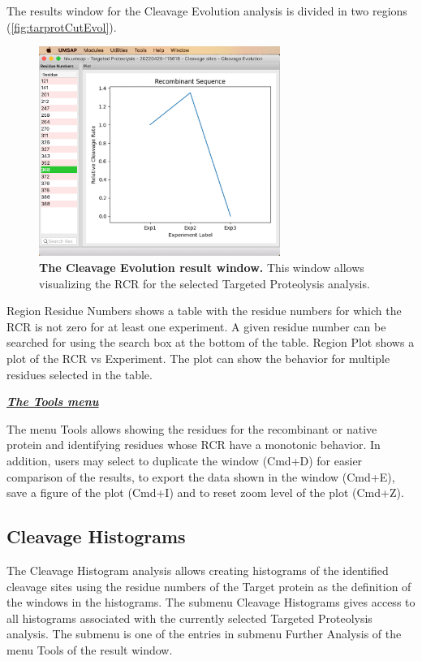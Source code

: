 The results window for the Cleavage Evolution analysis is divided in two regions
(\autoref{fig:tarprotCutEvol}).

\begin{figure}[h]
    \centering
    \includegraphics[width=0.7\textwidth]{./IMAGES/MOD-TARPROT/tarprot-cutevol.jpg}
    \caption[The Cleavage Evolution result window]{\textbf{The Cleavage Evolution
    result window.} This window allows visualizing the RCR for the selected Targeted
    Proteolysis analysis.}
    \label{fig:tarprotCutEvol}
    \vspace{-5pt}
\end{figure}

Region Residue Numbers shows a table with the residue numbers for which the RCR is
not zero for at least one experiment. A given residue number can be searched for using
the search box at the bottom of the table. Region Plot shows a plot of the RCR vs Experiment.
The plot can show the behavior for multiple residues selected in the table.

\textit{\textbf{\underline{The Tools menu}}}

The menu Tools allows showing the residues for the recombinant or native protein
and identifying residues whose RCR have a monotonic behavior. In addition,
users may select to duplicate the window (Cmd+D) for easier comparison of the results,
to export the data shown in the window (Cmd+E), save a figure of the plot (Cmd+I)
and to reset zoom level of the plot (Cmd+Z).

\subsection{Cleavage Histograms}
\label{subsec:tarprotHist}
The Cleavage Histogram analysis allows creating histograms of the identified cleavage
sites using the residue numbers of the Target protein as the definition of the windows
in the histograms. The submenu Cleavage Histograms gives access to all histograms
associated with the currently selected Targeted Proteolysis analysis. The submenu
is one of the entries in submenu Further Analysis of the menu Tools of the result window.

